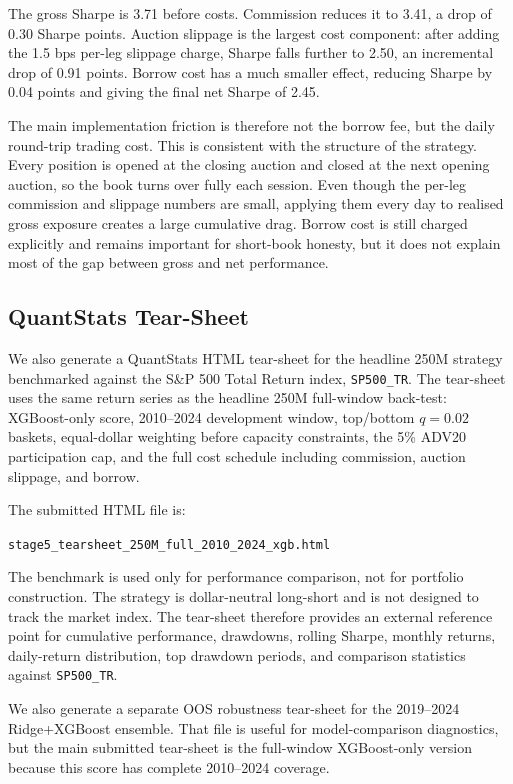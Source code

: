 \documentclass[12pt]{article}
\begin{document}
The gross Sharpe is 3.71 before costs. Commission reduces it to 3.41, a drop of 0.30 Sharpe points. Auction slippage is the largest cost component: after adding the 1.5 bps per-leg slippage charge, Sharpe falls further to 2.50, an incremental drop of 0.91 points. Borrow cost has a much smaller effect, reducing Sharpe by 0.04 points and giving the final net Sharpe of 2.45.

The main implementation friction is therefore not the borrow fee, but the daily round-trip trading cost. This is consistent with the structure of the strategy. Every position is opened at the closing auction and closed at the next opening auction, so the book turns over fully each session. Even though the per-leg commission and slippage numbers are small, applying them every day to realised gross exposure creates a large cumulative drag. Borrow cost is still charged explicitly and remains important for short-book honesty, but it does not explain most of the gap between gross and net performance.

\subsection{QuantStats Tear-Sheet}

We also generate a QuantStats HTML tear-sheet for the headline 250M strategy benchmarked against the S\&P 500 Total Return index, \texttt{SP500\_TR}. The tear-sheet uses the same return series as the headline 250M full-window back-test: XGBoost-only score, 2010--2024 development window, top/bottom \(q=0.02\) baskets, equal-dollar weighting before capacity constraints, the 5\% ADV20 participation cap, and the full cost schedule including commission, auction slippage, and borrow.

The submitted HTML file is:

\begin{center}
\texttt{stage5\_tearsheet\_250M\_full\_2010\_2024\_xgb.html}
\end{center}

The benchmark is used only for performance comparison, not for portfolio construction. The strategy is dollar-neutral long-short and is not designed to track the market index. The tear-sheet therefore provides an external reference point for cumulative performance, drawdowns, rolling Sharpe, monthly returns, daily-return distribution, top drawdown periods, and comparison statistics against \texttt{SP500\_TR}.

We also generate a separate OOS robustness tear-sheet for the 2019--2024 Ridge+XGBoost ensemble. That file is useful for model-comparison diagnostics, but the main submitted tear-sheet is the full-window XGBoost-only version because this score has complete 2010--2024 coverage.
\end{document}
